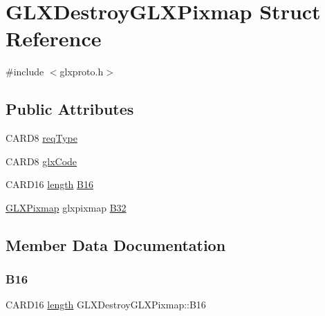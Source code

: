 \hypertarget{struct_g_l_x_destroy_g_l_x_pixmap}{}\section{G\+L\+X\+Destroy\+G\+L\+X\+Pixmap Struct Reference}
\label{struct_g_l_x_destroy_g_l_x_pixmap}


{\ttfamily \#include $<$glxproto.\+h$>$}

\subsection*{Public Attributes}
\begin{DoxyCompactItemize}
\item 
C\+A\+R\+D8 \hyperlink{struct_g_l_x_destroy_g_l_x_pixmap_a4e094a03cd022e3aa57fe41b81727903}{req\+Type}
\item 
C\+A\+R\+D8 \hyperlink{struct_g_l_x_destroy_g_l_x_pixmap_a433a8641bb3d06d475b8bcfbd125e212}{glx\+Code}
\item 
C\+A\+R\+D16 \hyperlink{glcorearb_8h_ab9c919755bde3b34349e23a32b4e0fa7}{length} \hyperlink{struct_g_l_x_destroy_g_l_x_pixmap_a9fc065311c360378a055459f1bb91133}{B16}
\item 
\hyperlink{glx_8h_a6577d581069de43ebaac50c78dbccbd0}{G\+L\+X\+Pixmap} glxpixmap \hyperlink{struct_g_l_x_destroy_g_l_x_pixmap_a0ce001590faa3d77501c7de5ce1e7b22}{B32}
\end{DoxyCompactItemize}


\subsection{Member Data Documentation}
\mbox{\label{struct_g_l_x_destroy_g_l_x_pixmap_a9fc065311c360378a055459f1bb91133}} 
\subsubsection{\texorpdfstring{B16}{B16}}
{\footnotesize\ttfamily C\+A\+R\+D16 \hyperlink{glcorearb_8h_ab9c919755bde3b34349e23a32b4e0fa7}{length} G\+L\+X\+Destroy\+G\+L\+X\+Pixmap\+::\+B16}

\mbox{\label{struct_g_l_x_destroy_g_l_x_pixmap_a0ce001590faa3d77501c7de5ce1e7b22}} 

